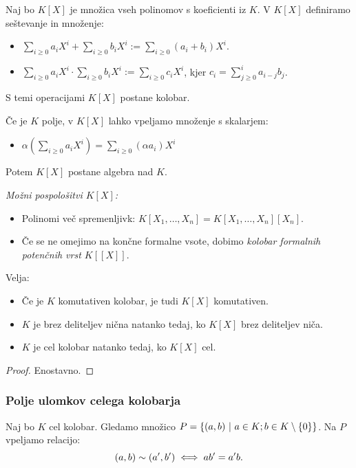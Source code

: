 Naj bo $K[X]$ je množica vseh polinomov s koeficienti iz $K$. V $K[X]$ definiramo seštevanje in množenje:
\begin{itemize}
    \item $\sum_{i \geq 0} a_iX^i + \sum_{i \geq 0} b_iX^i := \sum_{i \geq 0} (a_i + b_i)X^i$.
    \item $\sum_{i \geq 0} a_iX^i \cdot \sum_{i \geq 0} b_iX^i := \sum_{i \geq 0} c_iX^i$, kjer $c_i = \sum_{j \geq 0}^{i} a_{i - j} b_j$.
\end{itemize}
S temi operacijami $K[X]$ postane kolobar.
\begin{opomba}
    Če je $K$ polje, v $K[X]$ lahko vpeljamo množenje s skalarjem:
    \begin{itemize}
        \item $\alpha (\sum_{i \geq 0} a_iX^i) = \sum_{i \geq 0} (\alpha a_i)X^i$
    \end{itemize} 
    Potem $K[X]$ postane algebra nad $K$.
\end{opomba}
\emph{Možni pospološitvi $K[X]$:}
\begin{itemize}
    \item Polinomi več spremenljivk: $K[X_1, \ldots, X_n] = K[X_1, \ldots, X_n][X_n]$.
    \item Če se ne omejimo na končne formalne vsote, dobimo \emph{kolobar formalnih potenčnih vrst $K[[X]]$}.
\end{itemize}     

\begin{trditev}
    Velja:
    \begin{itemize}
        \item Če je $K$ komutativen kolobar, je tudi $K[X]$ komutativen.
        \item $K$ je brez deliteljev nična natanko tedaj, ko $K[X]$ brez deliteljev niča.
        \item $K$ je cel kolobar natanko tedaj, ko $K[X]$ cel.
    \end{itemize}
\end{trditev}

\begin{proof}
    Enostavno.
\end{proof}

\subsubsection*{Polje ulomkov celega kolobarja}    
Naj bo $K$ cel kolobar. Gledamo množico $P = \left\{(a,b) \ | \ a \in K; b \in K \setminus \left\{0\right\}\right\}$. Na $P$ vpeljamo relacijo:
$$(a, b) \sim (a', b') \iff ab' = a'b.$$

